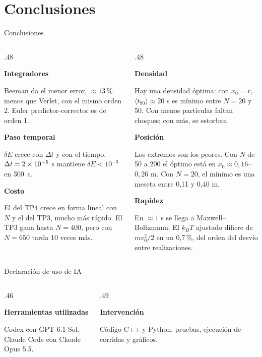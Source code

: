 \documentclass[aspectratio=169,11pt]{beamer}
\newcommand{\dt}{\Delta t}
\newcommand{\ficha}[3][itbablue]{%
  \par
  \begingroup
    \begin{minipage}{\linewidth}
    {\small\bfseries\color{#1}#2\par}\vspace{3pt}
    {\small\raggedright
      \setlength{\abovedisplayskip}{4pt}
      \setlength{\belowdisplayskip}{4pt}
      \setlength{\abovedisplayshortskip}{3pt}
      \setlength{\belowdisplayshortskip}{3pt}
      #3\par}
    \end{minipage}
  \endgroup\par\vspace{9pt}}
\begin{document}
\section{Conclusiones}
\begin{frame}\sectionpage\end{frame}

\begin{frame}{Conclusiones}
\begin{columns}[T,onlytextwidth]
\begin{column}{.48\textwidth}
\ficha{Integradores}{Beeman da el menor error, $\approx13\,\%$ menos que Verlet, con el mismo orden 2. Euler predictor-corrector es de orden 1.}
\ficha{Paso temporal}{$\delta E$ crece con $\dt$ y con el tiempo. $\dt=\pasoElegido$ s mantiene $\delta E<10^{-3}$ en $300$~s.}
\ficha{Costo}{El del TP4 crece en forma lineal con $N$ y el del TP3, mucho más rápido. El TP3 gana hasta $N=400$, pero con $N=650$ tarda 10 veces más.}
\end{column}
\begin{column}{.48\textwidth}
\ficha{Densidad}{Hay una densidad óptima: con $x_0=r$, $\langle t_{90}\rangle\approx20$ s es mínimo entre $N=20$ y 50. Con menos partículas faltan choques; con más, se estorban.}
\ficha{Posición}{Los extremos son los peores. Con $N$ de 50 a 200 el óptimo está en $x_0\approx0{,}16$--$0{,}26$ m. Con $N=20$, el mínimo es una meseta entre 0,11 y 0,40 m.}
\ficha{Rapidez}{En $\approx1$ s se llega a Maxwell--Boltzmann. El $k_BT$ ajustado difiere de $m v_0^2/2$ en un 0,7\,\%, del orden del desvío entre realizaciones.}
\end{column}
\end{columns}
\end{frame}

\begin{frame}{Declaración de uso de IA}
\begin{columns}[T,onlytextwidth]
\begin{column}{.46\textwidth}
\ficha{Herramientas utilizadas}{%
Codex con GPT-6.1 Sol.\\
Claude Code con Claude Opus 5.5.}
\end{column}
\begin{column}{.49\textwidth}
\ficha{Intervención}{%
Código C++ y Python, pruebas, ejecución de corridas y gráficos.}
\end{column}
\end{columns}
\end{frame}
\end{document}
